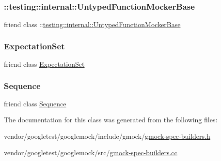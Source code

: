 \mbox{\label{classtesting_1_1_expectation_a709c2d6bee1223cfbcadc58e884cdb4b}} 
\subsubsection{\texorpdfstring{\+::testing\+::internal\+::\+Untyped\+Function\+Mocker\+Base}{::testing::internal::UntypedFunctionMockerBase}}
{\footnotesize\ttfamily friend class \+::\hyperlink{classtesting_1_1internal_1_1_untyped_function_mocker_base}{testing\+::internal\+::\+Untyped\+Function\+Mocker\+Base}\hspace{0.3cm}{\ttfamily [friend]}}

\mbox{\label{classtesting_1_1_expectation_acf5c2877a449d4ad1889ee5833ebb193}} 
\subsubsection{\texorpdfstring{Expectation\+Set}{ExpectationSet}}
{\footnotesize\ttfamily friend class \hyperlink{classtesting_1_1_expectation_set}{Expectation\+Set}\hspace{0.3cm}{\ttfamily [friend]}}

\mbox{\label{classtesting_1_1_expectation_a26271d5afaff6e6d3f00c055c63d0b24}} 
\subsubsection{\texorpdfstring{Sequence}{Sequence}}
{\footnotesize\ttfamily friend class \hyperlink{classtesting_1_1_sequence}{Sequence}\hspace{0.3cm}{\ttfamily [friend]}}



The documentation for this class was generated from the following files\+:\begin{DoxyCompactItemize}
\item 
vendor/googletest/googlemock/include/gmock/\hyperlink{gmock-spec-builders_8h}{gmock-\/spec-\/builders.\+h}\item 
vendor/googletest/googlemock/src/\hyperlink{gmock-spec-builders_8cc}{gmock-\/spec-\/builders.\+cc}\end{DoxyCompactItemize}
